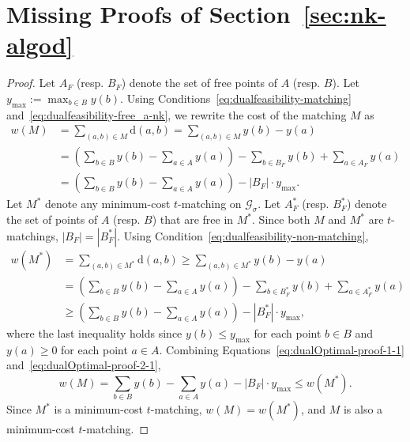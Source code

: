 \documentclass[11pt,onecolumn]{article}
\def\mcG{{\mathcal{G}}}
\newcommand{\distance}[2]{\mathrm{d}(#1, #2)}
\newcommand{\requests}{\sigma}
\begin{document}
%

%
%
%


















\section{Missing Proofs of Section~\ref{sec:nk-algod}}
\label{sec:nk-algo-appendix}


\partialoptimaltime*
\begin{proof}
Let $A_F$ (resp. $B_F$) denote the set of free points of $A$ (resp. $B$). Let $y_{\max}:=\max_{b\in B}y(b)$. 
Using Conditions~\eqref{eq:dualfeasibility-matching} and~\eqref{eq:dualfeasibility-free_a-nk}, we rewrite the cost of the matching $M$ as
\begin{align}
    w(M) &= \sum_{(a,b)\in M} \distance{a}{b} = \sum_{(a,b)\in M} y(b) - y(a)\nonumber \\ &= \left(\sum_{b\in B} y(b) - \sum_{a\in A} y(a)\right) - \sum_{b\in B_F} y(b) + \sum_{a\in A_F} y(a)\nonumber \\ &= \left(\sum_{b\in B} y(b) - \sum_{a\in A} y(a)\right) - |B_F|\cdot y_{\max}.
    \label{eq:dualOptimal-proof-1-1}
\end{align}
Let $M^*$ denote any minimum-cost $t$-matching on $\mcG_\requests$. Let $A^*_F$ (resp. $B^*_F$) denote the set of points of $A$ (resp. $B$) that are free in $M^*$. Since both $M$ and $M^*$ are $t$-matchings, $|B_F|=|B^*_F|$. Using Condition~\eqref{eq:dualfeasibility-non-matching},
\begin{align}
    w(M^*) &= \sum_{(a,b)\in M^*} \distance{a}{b} \ge \sum_{(a,b)\in M^*} y(b) - y(a)\nonumber \\ &= \left(\sum_{b\in B} y(b) - \sum_{a\in A} y(a)\right) - \sum_{b\in B^*_F} y(b) + \sum_{a\in A^*_F} y(a)\nonumber \\ &\ge \left(\sum_{b\in B} y(b) - \sum_{a\in A} y(a)\right) -  |B^*_F|\cdot y_{\max},
    \label{eq:dualOptimal-proof-2-1}
\end{align}
where the last inequality holds since $y(b)\le y_{\max}$ for each point $b\in B$ and $y(a)\ge 0$ for each point $a\in A$. Combining Equations~\eqref{eq:dualOptimal-proof-1-1} and~\eqref{eq:dualOptimal-proof-2-1},
\[w(M) = \sum_{b\in B} y(b) - \sum_{a\in A} y(a) - |B_F|\cdot y_{\max} \le w(M^*). \]
Since $M^*$ is a minimum-cost $t$-matching, $w(M)=w(M^*)$, and $M$ is also a minimum-cost $t$-matching.
\end{proof}
\end{document}
